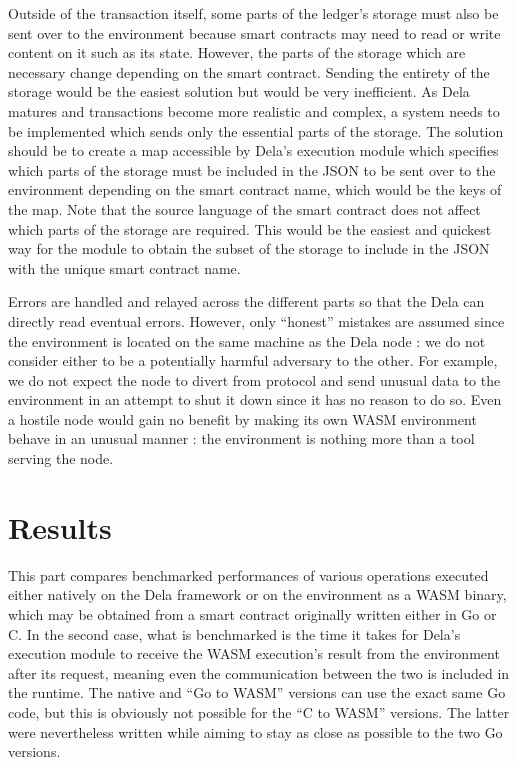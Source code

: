 \documentclass[11pt, a4paper, twoside, openright]{article}
\begin{document}
Outside of the transaction itself, some parts of the ledger's storage must also be sent over to the environment because smart contracts may need to read or write content on it such as its state. However, the parts of the storage which are necessary change depending on the smart contract. Sending the entirety of the storage would be the easiest solution but would be very inefficient. As Dela matures and transactions become more realistic and complex, a system needs to be implemented which sends only the essential parts of the storage. The solution should be to create a map accessible by Dela's execution module which specifies which parts of the storage must be included in the JSON to be sent over to the environment depending on the smart contract name, which would be the keys of the map. Note that the source language of the smart contract does not affect which parts of the storage are required. This would be the easiest and quickest way for the module to obtain the subset of the storage to include in the JSON with the unique smart contract name.

Errors are handled and relayed across the different parts so that the Dela can directly read eventual errors. However, only ``honest'' mistakes are assumed since the environment is located on the same machine as the Dela node : we do not consider either to be a potentially harmful adversary to the other. For example, we do not expect the node to divert from protocol and send unusual data to the environment in an attempt to shut it down since it has no reason to do so. Even a hostile node would gain no benefit by making its own WASM environment behave in an unusual manner : the environment is nothing more than a tool serving the node.
\section{Results}
This part compares benchmarked performances of various operations executed either natively on the Dela framework or on the environment as a WASM binary, which may be obtained from a smart contract originally written either in Go or C. In the second case, what is benchmarked is the time it takes for Dela's execution module to receive the WASM execution's result from the environment after its request, meaning even the communication between the two is included in the runtime. The native and ``Go to WASM'' versions can use the exact same Go code, but this is obviously not possible for the ``C to WASM'' versions. The latter were nevertheless written while aiming to stay as close as possible to the two Go versions.
\end{document}
